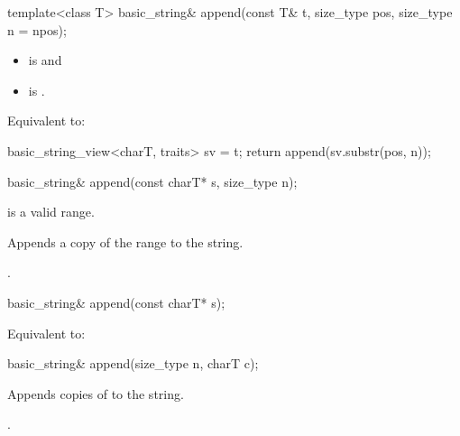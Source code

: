 %
\begin{itemdecl}
template<class T>
  basic_string& append(const T& t, size_type pos, size_type n = npos);
\end{itemdecl}

\begin{itemdescr}
\pnum
\constraints
\begin{itemize}
\item
{} is
 and
\item
{} is
.
\end{itemize}

\pnum
\effects
Equivalent to:
\begin{codeblock}
basic_string_view<charT, traits> sv = t;
return append(sv.substr(pos, n));
\end{codeblock}
\end{itemdescr}

%
\begin{itemdecl}
basic_string& append(const charT* s, size_type n);
\end{itemdecl}

\begin{itemdescr}
\pnum
\expects {} is a valid range.

\pnum
\effects Appends a copy of the range  to the string.

\pnum
\returns
{}.
\end{itemdescr}

%
\begin{itemdecl}
basic_string& append(const charT* s);
\end{itemdecl}

\begin{itemdescr}
\pnum
\effects Equivalent to: 
\end{itemdescr}

%
\begin{itemdecl}
basic_string& append(size_type n, charT c);
\end{itemdecl}

\begin{itemdescr}
\pnum
\effects Appends  copies of  to the string.

\pnum
\returns {}.
\end{itemdescr}

